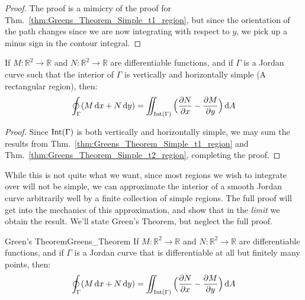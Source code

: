     \begin{proof}
        The proof is a mimicry of the proof for
        Thm.~\ref{thm:Greens_Theorem_Simple_t1_region},
        but since the orientation of the path changes
        since we are now integrating with respect to $y$,
        we pick up a minus sign in the contour integral.
    \end{proof}
    \begin{theorem}
        If $M:\mathbb{R}^{2}\rightarrow\mathbb{R}$ and
        $N:\mathbb{R}^{2}\rightarrow\mathbb{R}$ are
        differentiable functions, and if
        $\Gamma$ is a Jordan curve such that the
        interior of $\Gamma$ is vertically and horizontally
        simple (A rectangular region), then:
        \begin{equation}
            \oint_{\Gamma}(M\mathop{}\!\mathrm{d}{x}+N\mathop{}\!\mathrm{d}{y})=
            \iint_{\operatorname{Int}(\Gamma)}\Big(
            \frac{\partial{N}}{\partial{x}}-
            \frac{\partial{M}}{\partial{y}}\Big)\mathop{}\!\mathrm{d}{A}
        \end{equation}
    \end{theorem}
    \begin{proof}
        Since $\operatorname{Int}(\Gamma)$ is both vertically and
        horizontally simple, we may sum the results from
        Thm.~\ref{thm:Greens_Theorem_Simple_t1_region}
        and
        Thm.~\ref{thm:Greens_Theorem_Simple_t2_region},
        completing the proof.
    \end{proof}
    While this is not quite what we want, since most
    regions we wish to integrate over will not be simple,
    we can approximate the interior of a smooth Jordan
    curve arbitrarily well by a finite collection of
    simple regions. The full proof will get into the
    mechanics of this approximation, and show that in
    the \textit{limit} we obtain the result. We'll state
    Green's Theorem, but neglect the full proof.
    \begin{ltheorem}{Green's Theorem}{Greens_Theorem}
        If $M:\mathbb{R}^{2}\rightarrow\mathbb{R}$ and
        $N:\mathbb{R}^{2}\rightarrow\mathbb{R}$ are
        differentiable functions, and if
        $\Gamma$ is a Jordan curve that is differentiable at
        all but finitely many points, then:
        \begin{equation}
            \oint_{\Gamma}(M\mathop{}\!\mathrm{d}{x}+N\mathop{}\!\mathrm{d}{y})=
            \iint_{\operatorname{Int}(\Gamma)}\Big(
            \frac{\partial{N}}{\partial{x}}-
            \frac{\partial{M}}{\partial{y}}\Big)\mathop{}\!\mathrm{d}{A}
        \end{equation}
    \end{ltheorem}
